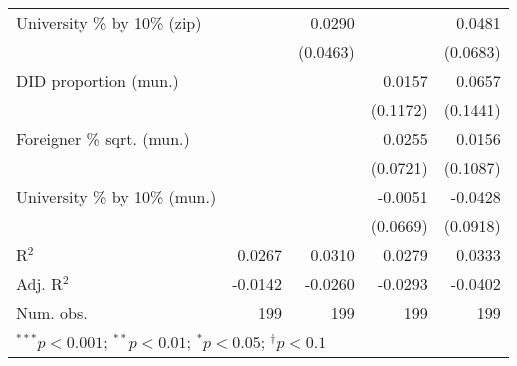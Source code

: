 \begin{tabular}{l D{.}{.}{3.5} D{.}{.}{3.5} D{.}{.}{3.5} D{.}{.}{3.5}}
University \% by 10\% (zip)       &          & 0.0290   &          & 0.0481   \\
                                  &          & (0.0463) &          & (0.0683) \\
DID proportion (mun.)             &          &          & 0.0157   & 0.0657   \\
                                  &          &          & (0.1172) & (0.1441) \\
Foreigner \% sqrt. (mun.)         &          &          & 0.0255   & 0.0156   \\
                                  &          &          & (0.0721) & (0.1087) \\
University \% by 10\% (mun.)      &          &          & -0.0051  & -0.0428  \\
                                  &          &          & (0.0669) & (0.0918) \\
\midrule
R$^2$                             & 0.0267   & 0.0310   & 0.0279   & 0.0333   \\
Adj. R$^2$                        & -0.0142  & -0.0260  & -0.0293  & -0.0402  \\
Num. obs.                         & 199      & 199      & 199      & 199      \\
\bottomrule
{}
\end{tabular}
